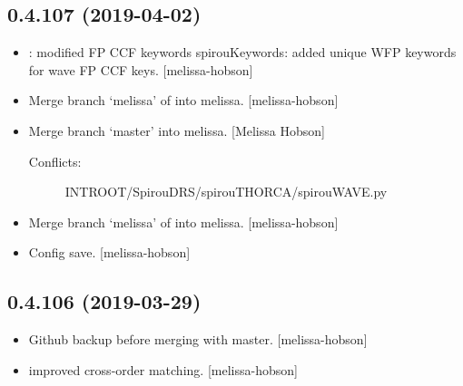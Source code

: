 \documentclass[a4paper,10pt,english]{report}
\begin{document}
\subsection{0.4.107 (2019-04-02)}
\label{\detokenize{misc/changelog:id154}}\begin{itemize}
\item {} 
: modified FP CCF keywords spirouKeywords: added unique
WFP keywords for wave FP CCF keys. {[}melissa-hobson{]}

\item {} 
Merge branch ‘melissa’ of  into
melissa. {[}melissa-hobson{]}

\item {} 
Merge branch ‘master’ into melissa. {[}Melissa Hobson{]}
\begin{description}
\item[{Conflicts:}] \leavevmode
INTROOT/SpirouDRS/spirouTHORCA/spirouWAVE.py

\end{description}

\item {} 
Merge branch ‘melissa’ of  into
melissa. {[}melissa-hobson{]}

\item {} 
Config save. {[}melissa-hobson{]}

\end{itemize}


\subsection{0.4.106 (2019-03-29)}
\label{\detokenize{misc/changelog:id155}}\begin{itemize}
\item {} 
Github backup before merging with master. {[}melissa-hobson{]}

\item {} 
 improved cross-order matching. {[}melissa-hobson{]}

\end{itemize}
\end{document}
